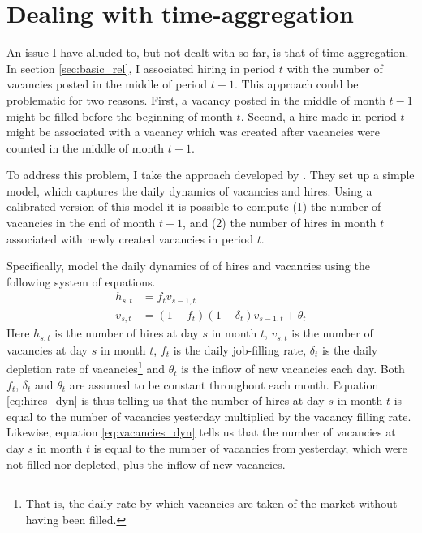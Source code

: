 \section{Dealing with time-aggregation}
\label{sec:time_agg}

An issue I have alluded to, but not dealt with so far, is that of time-aggregation. In section \ref{sec:basic_rel}, I associated 
 hiring in period $t$ with the number of vacancies posted in the middle of period $t-1$. This approach could be problematic for two reasons. First, a vacancy posted in the middle of month $t-1$ might be filled before the beginning of month $t$. Second, a hire made in period $t$ might be associated with a vacancy which was created after vacancies were counted in the middle of month $t-1$. 
 
To address this problem, I take the approach developed by \cite{Davis2013}. They set up a simple model, which captures the daily dynamics of vacancies and hires. Using a calibrated version of this model it is possible to compute (1) the number of vacancies in the end of month $t-1$, and (2) the number of hires in month $t$ associated with newly created vacancies in period $t$. 

Specifically, \cite{Davis2013} model the daily dynamics of of hires and vacancies using the following system of equations.
\begin{align}
h_{s,t}&=f_t v_{s-1,t} \label{eq:hires_dyn} \\
v_{s,t}&=(1-f_t)(1-\delta_t)v_{s-1,t} + \theta_t \label{eq:vacancies_dyn} 
\end{align}
Here $h_{s,t}$ is the number of hires at day $s$ in month $t$, $v_{s,t}$ is the number of vacancies at day $s$ in month $t$, $f_t$ is the daily job-filling rate, $\delta_t$ is the daily depletion rate of vacancies\footnote{That is, the daily rate by which vacancies are taken of the market without having been filled.} and $\theta_t$ is the inflow of new vacancies each day. Both $f_t$, $\delta_t$ and $\theta_t$ are assumed to be constant throughout each month. Equation \eqref{eq:hires_dyn} is thus telling us that the number of hires at day $s$ in month $t$ is equal to the number of vacancies yesterday multiplied by the vacancy filling rate. Likewise, equation \eqref{eq:vacancies_dyn} tells us that the number of vacancies at day $s$ in  month $t$ is equal to the number of vacancies from yesterday, which were not filled nor depleted, plus the inflow of new vacancies. 

